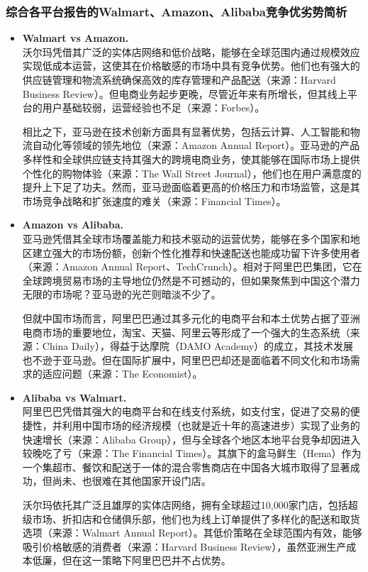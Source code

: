 \documentclass[12pt]{ctexart}
\begin{document}
\subsubsection{综合各平台报告的Walmart、Amazon、Alibaba竞争优劣势简析}
\begin{itemize}
    \item \textbf{Walmart vs Amazon.} \\
    沃尔玛凭借其广泛的实体店网络和低价战略，能够在全球范围内通过规模效应实现低成本运营，这使其在价格敏感的市场中具有竞争优势。他们也有强大的供应链管理和物流系统确保高效的库存管理和产品配送（来源：Harvard Business Review）。但电商业务起步更晚，尽管近年来有所增长，但其线上平台的用户基础较弱，运营经验也不足（来源：Forbes）。

    相比之下，亚马逊在技术创新方面具有显著优势，包括云计算、人工智能和物流自动化等领域的领先地位（来源：Amazon Annual Report）。亚马逊的产品多样性和全球供应链支持其强大的跨境电商业务，使其能够在国际市场上提供个性化的购物体验（来源：The Wall Street Journal），他们也在用户满意度的提升上下足了功夫。然而，亚马逊面临着更高的价格压力和市场监管，这是其市场竞争战略和扩张速度的难关（来源：Financial Times）。
    
    \item \textbf{Amazon vs Alibaba.} \\
    亚马逊凭借其全球市场覆盖能力和技术驱动的运营优势，能够在多个国家和地区建立强大的市场份额，创新个性化推荐和快速配送也能成功留下许多使用者（来源：Amazon Annual Report、TechCrunch）。相对于阿里巴巴集团，它在全球跨境贸易市场的主导地位仍然是不可撼动的，但如果聚焦到中国这个潜力无限的市场呢？亚马逊的光芒则暗淡不少了。

    但就中国市场而言，阿里巴巴通过其多元化的电商平台和本土优势占据了亚洲电商市场的重要地位，淘宝、天猫、阿里云等形成了一个强大的生态系统（来源：China Daily），得益于达摩院（DAMO Academy）的成立，其技术发展也不逊于亚马逊。但在国际扩展中，阿里巴巴却还是面临着不同文化和市场需求的适应问题（来源：The Economist）。
    
    \item \textbf{Alibaba vs Walmart.} \\
    阿里巴巴凭借其强大的电商平台和在线支付系统，如支付宝，促进了交易的便捷性，并利用中国市场的经济规模（也就是近十年的高速进步）实现了业务的快速增长（来源：Alibaba Group），但与全球各个地区本地平台竞争却因进入较晚吃了亏（来源：The Financial Times）。其旗下的盒马鲜生（Hema）作为一个集超市、餐饮和配送于一体的混合零售商店在中国各大城市取得了显著成功，但尚未、也很难在其他国家开设门店。

    沃尔玛依托其广泛且雄厚的实体店网络，拥有全球超过10,000家门店，包括超级市场、折扣店和仓储俱乐部，他们也为线上订单提供了多样化的配送和取货选项（来源：Walmart Annual Report）。其低价策略在全球范围内有效，能够吸引价格敏感的消费者（来源：Harvard Business Review），虽然亚洲生产成本低廉，但在这一策略下阿里巴巴并不占优势。
    
\end{itemize}
\end{document}
